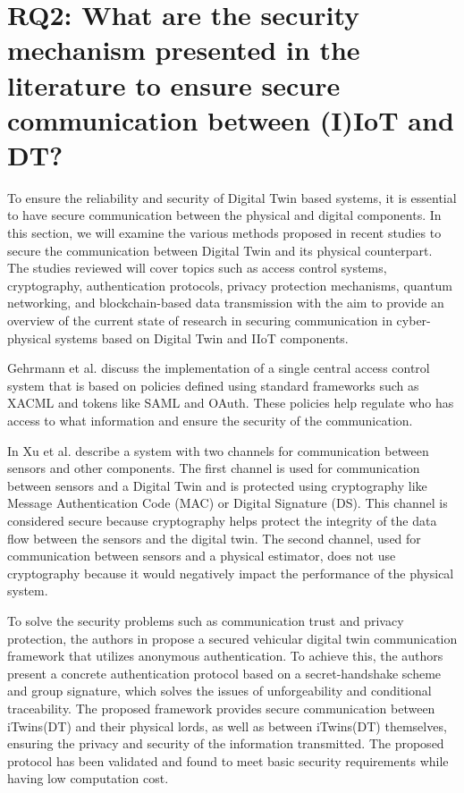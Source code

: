 %
%
\section{RQ2: What are the security mechanism presented in the literature to ensure secure communication between (I)IoT and DT?}

To ensure the reliability and security of Digital Twin based systems, it is essential to have secure communication between the physical and digital components. In this section, we will examine the various methods proposed in recent studies to secure the communication between Digital Twin and its physical counterpart. The studies reviewed will cover topics such as access control systems, cryptography, authentication protocols, privacy protection mechanisms, quantum networking, and blockchain-based data transmission with the aim to provide an overview of the current state of research in securing communication in cyber-physical systems based on Digital Twin and IIoT components.

Gehrmann et al.\cite{gehrmannDigitalTwinBased2020} discuss the implementation of a single central access control system that is based on policies defined using standard frameworks such as XACML and tokens like SAML and OAuth. These policies help regulate who has access to what information and ensure the security of the communication.  

In\cite{xuGametheoreticApproachSecure2020} Xu et al. describe a system with two channels for communication between sensors and other components. The first channel is used for communication between sensors and a Digital Twin and is protected using cryptography like Message Authentication Code (MAC) or Digital Signature (DS). This channel is considered secure because cryptography helps protect the integrity of the data flow between the sensors and the digital twin. The second channel, used for communication between sensors and a physical estimator, does not use cryptography because it would negatively impact the performance of the physical system.  

To solve the security problems such as communication trust and privacy protection, the authors in\cite{xuEfficientAuthenticationVehicular2021} propose a secured vehicular digital twin communication framework that utilizes anonymous authentication. To achieve this, the authors present a concrete authentication protocol based on a secret-handshake scheme and group signature, which solves the issues of unforgeability and conditional traceability. The proposed framework provides secure communication between iTwins(DT) and their physical lords, as well as between iTwins(DT) themselves, ensuring the privacy and security of the information transmitted. The proposed protocol has been validated and found to meet basic security requirements while having low computation cost.  

